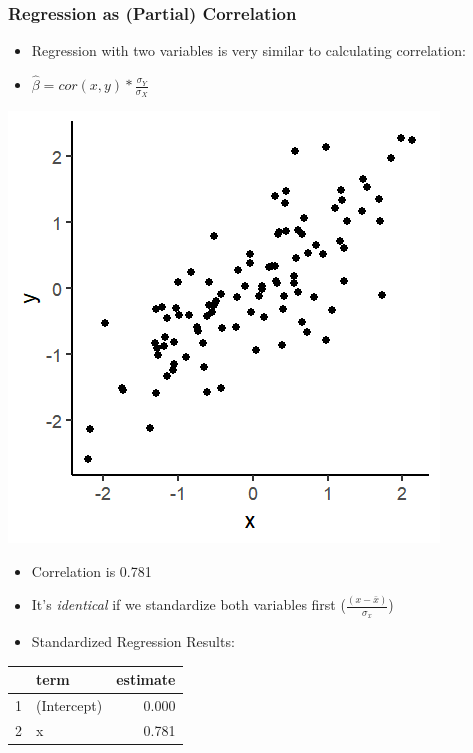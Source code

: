 \documentclass[xcolor=x11names,compress]{beamer}\usepackage[]{graphicx}\usepackage[]{color}
\makeatletter
\def\maxwidth{ %
  \ifdim\Gin@nat@width>\linewidth
    \linewidth
  \else
    \Gin@nat@width
  \fi
}
\newenvironment{knitrout}{}{} %
\renewcommand{\(}{\begin{columns}}
\renewcommand{\)}{\end{columns}}
\newcommand{\<}[1]{\begin{column}{#1}}
\renewcommand{\>}{\end{column}}
\makeatother
\begin{document}
\begin{frame}
\frametitle{Regression as (Partial) Correlation}
\begin{itemize}
\item Regression with two variables is very similar to calculating correlation:
\item $\hat{\beta}=cor(x,y) * \frac{\sigma_Y}{\sigma_X}$
\end{itemize}
\begin{multicols}{2}
\begin{knitrout}
\color{fgcolor}
\includegraphics[width=\maxwidth]{figure/corr_regn_fig3-1} 

\end{knitrout}
\columnbreak
\begin{itemize}
\item Correlation is 0.781
\item It's \textit{identical} if we standardize both variables first ($\frac{(x-\bar{x})}{\sigma_x}$)
\item Standardized Regression Results:
\end{itemize}
\begin{table}[ht]
\centering
\begin{tabular}{rlr}
  \hline
 & term & estimate \\ 
  \hline
1 & (Intercept) & 0.000 \\ 
  2 & x & 0.781 \\ 
   \hline
\end{tabular}
\end{table}

\end{multicols}
\end{frame}
\end{document}
